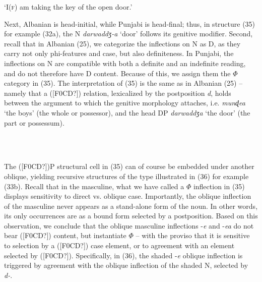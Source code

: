 \documentclass[output=paper]{langsci/langscibook}
\begin{document}
\begin{styleSfondomedioiColorexi}
‘I(\textsc{f}) am taking the key of the open door.’
\end{styleSfondomedioiColorexi}

\begin{styleparagrafo}
Next, Albanian is head-initial, while Punjabi is head-final; thus, in structure (35) for example (32a), the N \textit{darwaddʒ-a} ‘door’ follows its genitive modifier. Second, recall that in Albanian (25), we categorize the inflections on N as D, as they carry not only phi-features and case, but also definiteness. In Punjabi, the inflections on N are compatible with both a definite and an indefinite reading, and do not therefore have D content. Because of this, we assign them the $\Phi $ category in (35). The interpretation of (35) is the same as in Albanian (25) – namely that a ([F0CD?]) relation, lexicalized by the postposition \textit{d}, holds between the argument to which the genitive morphology attaches, i.e. \textit{munɖea} ‘the boys’ (the whole or possessor), and the head DP \textit{darwaddʒ}\textit{a} ‘the door’ (the part or possessum).
\end{styleparagrafo}

\begin{styleGrigliamediaiiColorexi}
\ea%
    \label{ex:key:35}
    \gll\\
        \\
    \glt
    \z

        
\end{styleGrigliamediaiiColorexi}

 

The ([F0CD?])P structural cell in (35) can of course be embedded under another oblique, yielding recursive structures of the type illustrated in (36) for example (33b). Recall that in the masculine, what we have called a $\Phi $ inflection in (35) displays sensitivity to direct vs. oblique case.  Importantly, the oblique inflection of the masculine never appears as a stand-alone form of the noun. In other words, its only occurrences are as a bound form selected by a postposition. Based on this observation, we conclude that the oblique masculine inflections -\textit{e} and -\textit{ea} do not bear ([F0CD?]) content, but instantiate $\Phi $ – with the proviso that it is sensitive to selection by a ([F0CD?]) case element, or to agreement with an element selected by ([F0CD?]). Specifically, in (36), the shaded -\textit{e} oblique inflection is triggered by agreement with the oblique inflection of the shaded N, selected by \textit{d-}.
\end{document}
